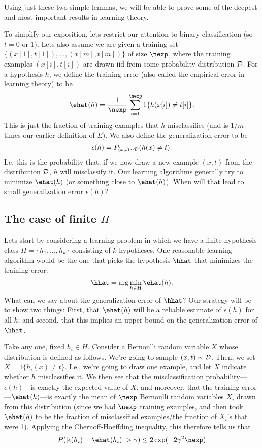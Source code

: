 Using just these two simple lemmas, we will be able to prove some
of the deepest and most important results in learning theory.  

To simplify our exposition, lets restrict our attention to binary classification (so $t=0$ or $1$). 
Lets also assume we are given a training set $\{(x[1], t[1]),\ldots, (x[m], t[m])\}$ of size $\nexp$, 
where the training examples $(x[i], t[i])$ are drawn iid from 
some probability distribution ${\cal D}$.
For a hypothesis $h$, we define the training error (also called the empirical
error in learning theory) to be 
\[
\ehat(h) = \frac{1}{\nexp}\sum_{i=1}^\nexp 1\{h(x[i]) \neq t[i]\}.
\]
This is just the fraction of training examples that $h$ misclassifies (and is $1/m$ times
our earlier definition of $E$).  We also define the generalization error to be
\[
\epsilon(h) = P_{(x,t)\sim {\cal D}}(h(x) \neq t).
\]
I.e. this is the probability that, if we now draw a new example $(x,t)$ from the distribution 
${\cal D}$, $h$ will misclassify it.  Our learning algorithms generally try to minimize
$\ehat(h)$ (or something close to $\ehat(h)$).  When will that lead to small 
generalization error $\epsilon(h)$?  

\subsection{The case of finite $H$}

Lets start by considering a learning problem in which we have a finite hypothesis 
class $H = \{h_1, \ldots, h_k\}$ consisting of $k$ hypotheses.  One reasonable 
learning algorithm would be the one that picks the hypothesis $\hhat$ that minimizes 
the training error: 
\[
\hhat = \arg \min_{h \in H}\ehat(h).
\]
What can we say about the generalization error of $\hhat$?  
Our strategy will be to show two things: First, that $\ehat(h)$ will be a
reliable estimate of $\epsilon(h)$ for all $h$; and second, that this implies
an upper-bound on the generalization error of $\hhat$. 

Take any one, fixed $h_i \in H$.  Consider a Bernoulli random variable $X$ whose 
distribution is defined as follows.  We're going to sample $(x, t) \sim {\cal D}$.  
Then, we set $X = 1\{h_i(x) \neq t\}$.  I.e., we're going to draw one example, 
and let $X$ indicate whether $h$ misclassifies it.  We then see that 
the misclassification probability---$\epsilon(h)$---is exactly the expected value of 
$X$, and moreover, that the training error---$\ehat(h)$---is exactly the mean of
$\nexp$ Bernoulli random variables $X_i$ drawn from this distribution (since we had $\nexp$ training
examples, and then took $\ehat(h)$ to be the fraction of misclassified examples/the
fraction of $X_i$'s that were 1).  Applying the Chernoff-Hoeffding inequality, this
therefore tells us that
\[
P(|\epsilon(h_i) - \ehat(h_i)| > \gamma) \leq 2\exp(-2\gamma^2\nexp)
\]

